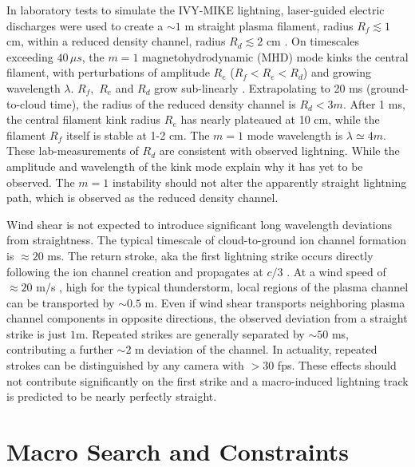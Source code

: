 \documentclass[%
reprint,
 amsmath,amssymb,
 aps,
 prd,
]{revtex4-2}
\begin{document}
        In laboratory tests to simulate the IVY-MIKE lightning, laser-guided electric discharges were used to create a ${\sim 1}$ m straight plasma filament, radius $R_f\lesssim 1$ cm, within a reduced density channel, radius $R_d \lesssim 2$ cm \citep[][fig. 6]{IVY-MIKE1987}. On timescales exceeding $40 \, \mu s$, the $m=1$ magnetohydrodynamic (MHD) mode kinks the central filament, with perturbations of amplitude $R_e$ ($R_f < R_e < R_d$) and growing wavelength $\lambda$. $R_f$,\, $R_e$ and $R_d$ grow sub-linearly \citep[][fig. 9]{IVY-MIKE1987}. Extrapolating to 20 ms (ground-to-cloud time), the radius of the reduced density channel is $R_d<3m$. After 1 ms, the central filament kink radius $R_e$ has nearly plateaued at 10 cm, while the filament $R_f$ itself is stable at 1-2 cm. The $m=1$ mode wavelength is $\lambda\simeq4 m$. These lab-measurements of $R_d$ are consistent with observed lightning. While the amplitude and wavelength of the kink mode explain why it has yet to be observed. The $m=1$ instability should not alter the apparently straight lightning path, which is observed as the reduced density channel.

        Wind shear is not expected to introduce significant long wavelength deviations from straightness. The typical timescale of cloud-to-ground ion channel formation is ${\approx 20}$ ms. The return stroke, aka the first lightning strike \citep{DwyerUman2014} occurs directly following the ion channel creation and propagates at $c/3$ \citep{Idone1987}. At a wind speed of ${\approx 20}$ m/s \citep{Choi2004}, high for the typical thunderstorm, local regions of the plasma channel can be transported by ${\sim 0.5}$ m. Even if wind shear transports neighboring plasma channel components in opposite directions, the observed deviation from a straight strike is just $1$m. Repeated strikes are generally separated by ${\sim 50}$ ms, contributing a further ${\sim 2}$ m deviation of the channel. In actuality, repeated strokes can be distinguished by any camera with $>30$ fps. These effects should not contribute significantly on the first strike and a macro-induced lightning track is predicted to be nearly perfectly straight.




\section{Macro Search and Constraints}%
\label{sec:macro_search_and_constraints}
\end{document}
